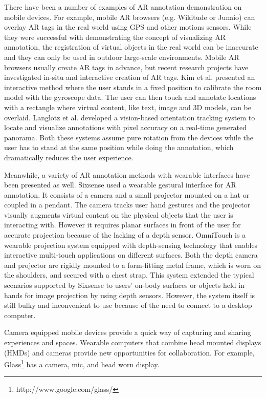 There have been a number of examples of AR annotation demonstration on mobile devices. For example, mobile AR browsers (e.g. Wikitude or Junaio) can overlay AR tags in the real world using  GPS and other motions sensors. While they were successful with demonstrating the concept of visualizing AR annotation, the registration of virtual objects in the real world can be inaccurate and they can only be used in outdoor large-scale environments. Mobile AR browsers usually create AR tags in advance, but recent research projects have investigated in-situ and interactive creation of AR tags. Kim et al. \cite{Kim:2011:IAS} presented an interactive method where the user stands in a fixed position to calibrate the room model with the gyroscope data. The user can then touch and annotate locations with a rectangle where virtual content, like text, image and 3D models, can be overlaid.  Langlotz et al. \cite{Langlotz:2012:OCP} developed a vision-based orientation tracking system to locate and visualize annotations with pixel accuracy on a real-time generated panorama. Both these systems assume pure rotation from the devices while the user has to stand at the same position while doing the annotation, which dramatically reduces the user experience.

Meanwhile, a variety of AR annotation methods with wearable interfaces have been presented as well. Sixsense \cite{Mistry:2009:WWU} used a wearable gestural interface for AR annotation. It consists of a camera and a small projector mounted on a hat or coupled in a pendant. The camera tracks user hand gestures and the projector visually augments virtual content on the physical objects that the user is interacting with. However it requires planar surfaces in front of the user for accurate projection because of the lacking of a depth sensor. OmniTouch \cite{Harrison:2011:OTW} is a wearable projection system equipped with depth-sensing technology that enables interactive multi-touch applications on different surfaces. Both the depth camera and projector are rigidly mounted to a form-fitting metal frame, which is worn on the shoulders, and secured with a chest strap. This system extended the typical scenarios supported by Sixsense to  users' on-body surfaces or objects held in hands for image projection by using depth sensors. However, the system itself is still bulky and inconvenient to use because of the need to connect to a desktop computer.

Camera equipped mobile devices provide a quick way of capturing and sharing experiences and spaces. Wearable
computers that combine head mounted displays (HMDs) and cameras provide new opportunities for collaboration. For example, Glass\footnote{http://www.google.com/glass/} has a camera, mic, and head worn display.

